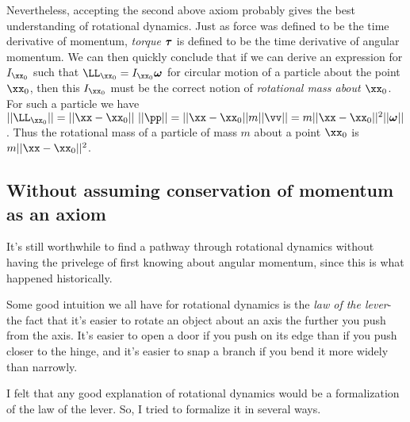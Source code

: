 \documentclass{article}
\begin{document}
Nevertheless, accepting the second above axiom probably gives the best understanding of rotational dynamics. Just as force was defined to be the time derivative of momentum, \textit{torque} $\boldsymbol{\tau}$ is defined to be the time derivative of angular momentum. We can then quickly conclude that if we can derive an expression for $I_{\xx_0}$ such that $\LL_{\xx_0} = I_{\xx_0} \oomega$ for circular motion of a particle about the point $\xx_0$, then this $I_{\xx_0}$ must be the correct notion of \textit{rotational mass about $\xx_0$}. For such a particle we have $||\LL_{\xx_0}|| = ||\xx - \xx_0|| \spc ||\pp|| = ||\xx - \xx_0|| m ||\vv|| = m ||\xx - \xx_0||^2 ||\oomega||$. Thus the rotational mass of a particle of mass $m$ about a point $\xx_0$ is $m ||\xx - \xx_0||^2$.

\subsection*{Without assuming conservation of momentum as an axiom}

It's still worthwhile to find a pathway through rotational dynamics without having the privelege of first knowing about angular momentum, since this is what happened historically.

Some good intuition we all have for rotational dynamics is the \textit{law of the lever}- the fact that it's easier to rotate an object about an axis the further you push from the axis. It's easier to open a door if you push on its edge than if you push closer to the hinge, and it's easier to snap a branch if you bend it more widely than narrowly.

I felt that any good explanation of rotational dynamics would be a formalization of the law of the lever. So, I tried to formalize it in several ways.
\end{document}
